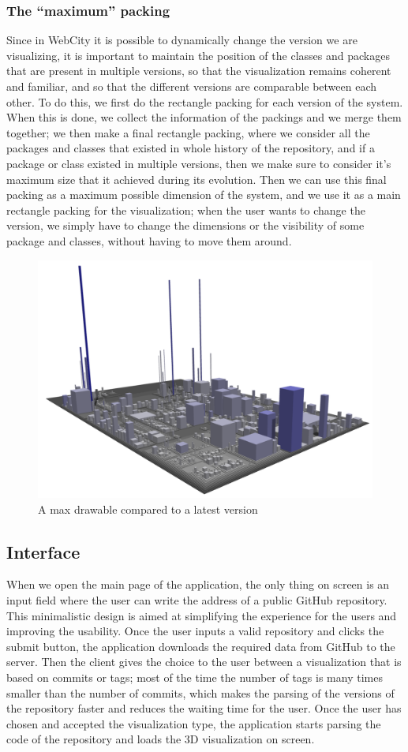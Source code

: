 \documentclass[]{usiinfbachelorproject}
\begin{document}
\subsubsection{The ``maximum'' packing} \label{The ``maximum'' packing}
Since in WebCity it is possible to dynamically change the version we are visualizing, it is important to maintain the position of the classes and packages that are present in multiple versions, so that the visualization remains coherent and familiar, and so that the different versions are comparable between each other.
To do this, we first do the rectangle packing for each version of the system. When this is done, we collect the information of the packings and we merge them together; we then make a final rectangle packing, where we consider all the packages and classes that existed in whole history of the repository, and if a package or class existed in multiple versions, then we make sure to consider it's maximum size that it achieved during its evolution.
Then we can use this final packing as a maximum possible dimension of the system, and we use it as a main rectangle packing for the visualization; when the user wants to change the version, we simply have to change the dimensions or the visibility of some package and classes, without having to move them around.

\begin{figure} [H]
\centering
\includegraphics[width=.5\textwidth]{pictures/example.png}
\caption{A max drawable compared to a latest version}
\label{fig:flow}
\end{figure}

\subsection{Interface} \label{Interface}

When we open the main page of the application, the only thing on screen is an input field where the user can write the address of a public GitHub repository. This minimalistic design is aimed at simplifying the experience for the users and improving the usability. Once the user inputs a valid repository and clicks the submit button, the application downloads the required data from GitHub to the server. Then the client gives the choice to the user between a visualization that is based on commits or tags; most of the time the number of tags is many times smaller than the number of commits, which makes the parsing of the versions of the repository faster and reduces the waiting time for the user. Once the user has chosen and accepted the visualization type, the application starts parsing the code of the repository and loads the 3D visualization on screen.
\end{document}
